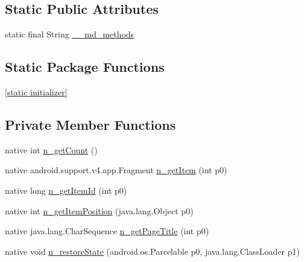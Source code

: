 \subsection*{Static Public Attributes}
\begin{CompactItemize}
\item 
static final String \hyperlink{classmd5270abb39e60627f0f200893b490a1ade_1_1_forms_fragment_pager_adapter__1_8ceb71ce95bf7e4591c10f858ad3dd52}{\_\-\_\-md\_\-methods}
\end{CompactItemize}
\subsection*{Static Package Functions}
\begin{CompactItemize}
\item 
\hyperlink{classmd5270abb39e60627f0f200893b490a1ade_1_1_forms_fragment_pager_adapter__1_8e7d867087c5b110a0eef7ef72dde75a}{\mbox{[}static initializer\mbox{]}}
\end{CompactItemize}
\subsection*{Private Member Functions}
\begin{CompactItemize}
\item 
native int \hyperlink{classmd5270abb39e60627f0f200893b490a1ade_1_1_forms_fragment_pager_adapter__1_1a8c2f11836b8ec318f92bc0b1d1c1fa}{n\_\-getCount} ()
\item 
native android.support.v4.app.Fragment \hyperlink{classmd5270abb39e60627f0f200893b490a1ade_1_1_forms_fragment_pager_adapter__1_ee0c06a0d33282513e5e577ec4d11f92}{n\_\-getItem} (int p0)
\item 
native long \hyperlink{classmd5270abb39e60627f0f200893b490a1ade_1_1_forms_fragment_pager_adapter__1_c92c06a73a03bbf1c890db05f3e9fb85}{n\_\-getItemId} (int p0)
\item 
native int \hyperlink{classmd5270abb39e60627f0f200893b490a1ade_1_1_forms_fragment_pager_adapter__1_84b7d4e1e9df9aba392089a18608a379}{n\_\-getItemPosition} (java.lang.Object p0)
\item 
native java.lang.CharSequence \hyperlink{classmd5270abb39e60627f0f200893b490a1ade_1_1_forms_fragment_pager_adapter__1_2660ebffd7dc94c56dec8e3d987f48c9}{n\_\-getPageTitle} (int p0)
\item 
native void \hyperlink{classmd5270abb39e60627f0f200893b490a1ade_1_1_forms_fragment_pager_adapter__1_dbf99747b00bb31865eab9b5717bbc0b}{n\_\-restoreState} (android.os.Parcelable p0, java.lang.ClassLoader p1)
\end{CompactItemize}
